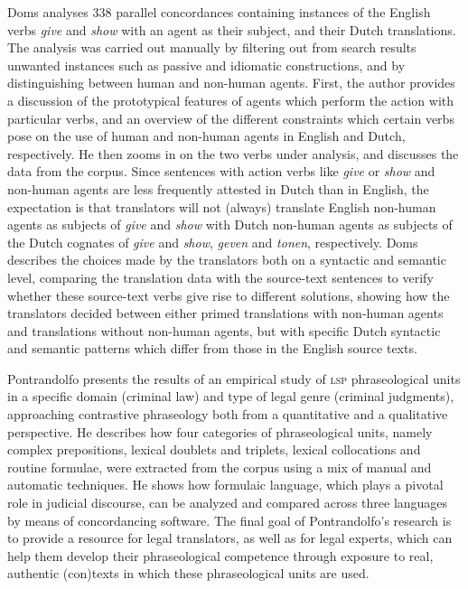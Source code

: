 \documentclass[output=paper]{LSP/langsci}
\begin{document}
Doms analyses 338 parallel concordances containing instances of the English verbs \textit{give} and \textit{show} with an agent as their subject, and their Dutch translations. The analysis was carried out manually by filtering out from search results unwanted instances such as passive and idiomatic constructions, and by distinguishing between human and non-human agents. First, the author provides a discussion of the prototypical features of agents which perform the action with particular verbs, and an overview of the different constraints which certain verbs pose on the use of human and non-human agents in English and Dutch, respectively. He then zooms in on the two verbs under analysis, and discusses the data from the corpus. Since sentences with action verbs like \textit{give} or \textit{show} and non-human agents are less frequently attested in Dutch than in English, the expectation is that translators will not (always) translate English non-human agents as subjects of \textit{give} and \textit{show} with Dutch non-human agents as subjects of the Dutch cognates of \textit{give} and \textit{show}, \textit{geven} and \textit{tonen}, respectively. Doms describes the choices made by the translators both on a syntactic and semantic level, comparing the translation data with the source-text sentences to verify whether these source-text verbs give rise to different solutions, showing how the translators decided between either primed translations with non-human agents and translations without non-human agents, but with specific Dutch syntactic and semantic patterns which differ from those in the English source texts.

Pontrandolfo presents the results of an empirical study of \textsc{lsp} phraseological units in a specific domain (criminal law) and type of legal genre (criminal judgments), approaching contrastive phraseology both from a quantitative and a qualitative perspective. He describes how four categories of phraseological units, namely complex prepositions, lexical doublets and triplets, lexical collocations and routine formulae, were extracted from the corpus using a mix of manual and automatic techniques. He shows how formulaic language, which plays a pivotal role in judicial discourse, can be analyzed and compared across three languages by means of concordancing software. The final goal of Pontrandolfo’s research is to provide a resource for legal translators, as well as for legal experts, which can help them develop their phraseological competence through exposure to real, authentic (con)texts in which these phraseological units are used.
\end{document}
